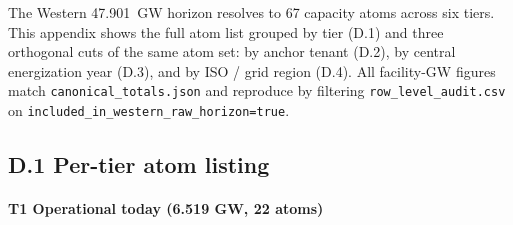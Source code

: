 \documentclass[11pt,a4paper]{article}
\begin{document}
\noindent The Western 47.901~GW horizon resolves to 67 capacity atoms across six tiers. This appendix shows the full atom list grouped by tier (D.1) and three orthogonal cuts of the same atom set: by anchor tenant (D.2), by central energization year (D.3), and by ISO / grid region (D.4). All facility-GW figures match \texttt{canonical\_totals.json} and reproduce by filtering \texttt{row\_level\_audit.csv} on \texttt{included\_in\_western\_raw\_horizon=true}.

\subsection*{D.1 \quad Per-tier atom listing}


\paragraph{\textbf{T1 Operational today (6.519 GW, 22 atoms)}}~\\[0.3em]
\end{document}
